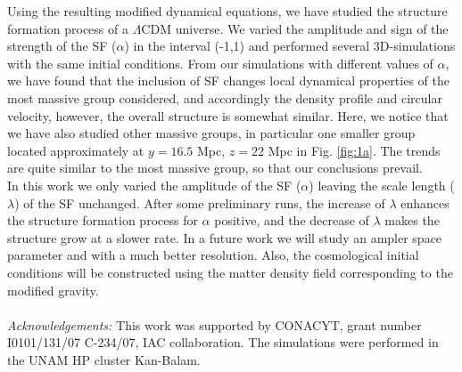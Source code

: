 \documentclass{article}
\begin{document}
Using the resulting modified dynamical equations, we
have studied the structure formation process of a $\Lambda$CDM
universe. We varied the amplitude and sign of the
strength of the SF ($\alpha$) in the interval (-1,1) and performed several 3D-simulations with the same initial conditions. From our simulations with different values of $\alpha$, we have found that the inclusion of SF changes local dynamical properties of the most massive group considered,
and accordingly the density profile and circular velocity,
however, the overall structure is somewhat similar. Here,
we notice that we have also studied other massive groups,
in particular one smaller group located approximately at
$y = 16.5$ Mpc, $z = 22$ Mpc in Fig. \ref{fig:1a}. The trends
are quite similar to the most massive group, so that our
conclusions prevail.\\
In this work we only varied the amplitude of the SF
($\alpha$) leaving the scale length ($\lambda$) of the SF unchanged.
After some preliminary runs, the increase of $\lambda$ enhances
the structure formation process for $\alpha$ positive, and the decrease of $\lambda$ makes the structure grow at a slower rate.
In a future work we will study an ampler space parameter
and with a much better resolution. Also, the cosmological
initial conditions will be constructed using the matter
density field corresponding to the modified gravity.
\\
\\
\textit{Acknowledgements:} This work was supported by
CONACYT, grant number I0101/131/07 C-234/07, IAC
collaboration. The simulations were performed in the
UNAM HP cluster Kan-Balam.

 
\end{document}
